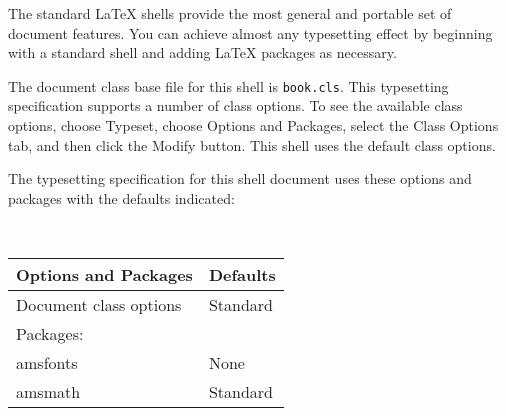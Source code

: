 \documentclass{book}%
\begin{document}
The standard \LaTeX{} shells provide the most general and portable set of
document features. You can achieve almost any typesetting effect by beginning
with a standard shell and adding \LaTeX{} packages as necessary.

The document class base file for this shell is \texttt{book.cls}. This
typesetting specification supports a number of class options. To see the
available class options, choose \textsf{Typeset, }choose \textsf{Options and
Packages}, select the \textsf{Class Options} tab, and then click the
\textsf{Modify} button. This shell uses the default class options.

The typesetting specification for this shell document uses these options and
packages with the defaults indicated:

\begin{center}
\
\begin{tabular}
[c]{ll}%
\textbf{Options and Packages} & \textbf{Defaults}\\\hline
Document class options & Standard\\
Packages: & \\
\quad amsfonts & None\\
\quad amsmath & Standard\\\hline
\end{tabular}

\end{center}%
\end{document}
